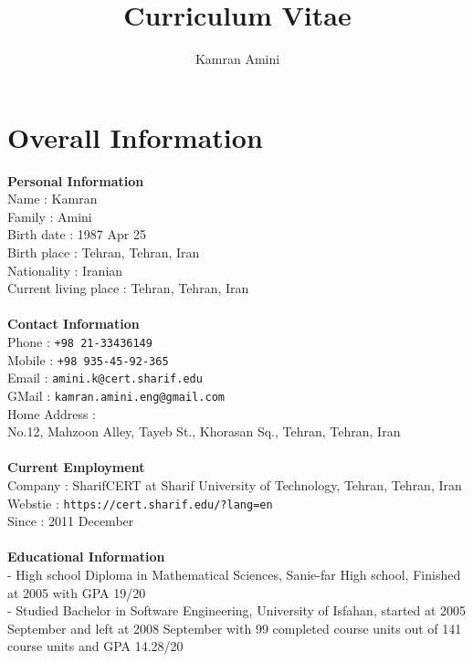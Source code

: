 \documentclass[12pt,a4paper]{article}
\begin{document}
\title{Curriculum Vitae}
\author{Kamran Amini}
\maketitle

\section{Overall Information}

	\small \textbf{Personal Information} \\
			\indent Name : Kamran \\
			\indent Family : Amini \\
			\indent Birth date : 1987 Apr 25 \\
			\indent Birth place : Tehran, Tehran, Iran \\
			\indent Nationality : Iranian \\
			\indent Current living place : Tehran, Tehran, Iran \\
			\\
	\small \textbf{Contact Information} \\
			\indent Phone : 
			\indent \indent \texttt{+98 21-33436149} \\
			\indent Mobile : 
			\indent\indent \texttt{+98 935-45-92-365} \\
			\indent	Email :  
			\indent \indent \texttt{amini.k@cert.sharif.edu} \\ 
			\indent GMail :
			\indent \indent \texttt{kamran.amini.eng@gmail.com} \\
			\indent Home Address : \\ \indent \indent No.12, Mahzoon Alley, Tayeb St., Khorasan Sq., Tehran, Tehran, Iran \\
			\\
	\small \textbf{Current Employment} \\
			\indent Company : SharifCERT at Sharif University of Technology, Tehran, Tehran, Iran \\
			\indent Webstie : \texttt{https://cert.sharif.edu/?lang=en} \\
			\indent Since : 2011 December \\
			\\					
	\small \textbf{ Educational Information} \\
			\indent - High school Diploma in Mathematical Sciences, Sanie-far High school, Finished at 2005 with GPA 19/20 \\
			\indent - Studied Bachelor in Software Engineering, University of Isfahan, started at 2005 September and left at 2008 September with 99 completed course units out of 141 course units and GPA 14.28/20 \\
\end{document}
